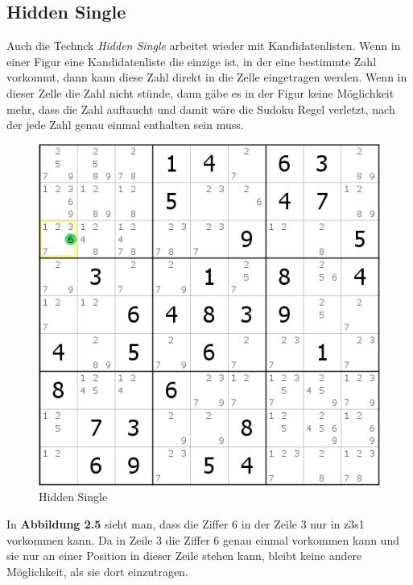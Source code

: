 \newpage
\subsection{Hidden Single}
Auch die Technck \textit{Hidden Single} arbeitet wieder mit Kandidatenlisten. Wenn in einer Figur eine Kandidatenliste die einzige ist, in der eine bestimmte Zahl vorkommt, dann kann diese Zahl direkt in die Zelle eingetragen werden. Wenn in dieser Zelle die Zahl nicht stünde, dann gäbe es in der Figur keine Möglichkeit mehr, dass die Zahl auftaucht und damit wäre die Sudoku Regel verletzt, nach der jede Zahl genau einmal enthalten sein muss.

\begin{figure}[h]
\begin{center}
\includegraphics{./img/hidden_single.png}
\caption{Hidden Single}
\end{center}
\end{figure}

In \textbf{Abbildung 2.5} sieht man, dass die Ziffer 6 in der Zeile 3 nur in z3s1 vorkommen kann. Da in Zeile 3 die Ziffer 6 genau einmal vorkommen kann und sie nur an einer Position in dieser Zeile stehen kann, bleibt keine andere Möglichkeit, als sie dort einzutragen.
